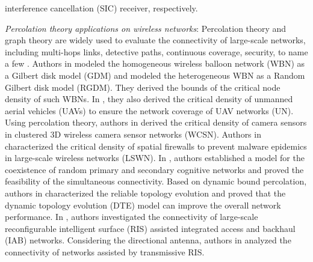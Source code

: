 interference cancellation (SIC) receiver, respectively.

\indent \textit{Percolation theory applications on wireless networks}: Percolation theory and graph theory are widely used to evaluate the connectivity of large-scale networks, including multi-hops links, detective paths, continuous coverage, security, to name a few \cite{haenggi2009stochastic,haenggi2012stochastic,elsawy2023tutorial}. Authors in \cite{anjum2019percolation} modeled the homogeneous wireless balloon network (WBN) as a Gilbert disk model (GDM) and modeled the heterogeneous WBN as a Random Gilbert disk model (RGDM).
They derived the bounds of the critical node density of such WBNs. In \cite{anjum2020coverage}, they also derived the critical density of unmanned aerial vehicles (UAVs) to ensure the network coverage of UAV networks (UN). Using percolation theory, authors in \cite{wang2019cooperative} derived the critical density of camera sensors in clustered 3D wireless camera sensor networks (WCSN). Authors in \cite{zhaikhan2020safeguarding} characterized the critical density of spatial firewalls to prevent malware epidemics in large-scale wireless networks (LSWN). In \cite{yemini2019simultaneous}, authors established a model for the coexistence of random primary and secondary cognitive networks and proved the feasibility of the simultaneous connectivity. Based on dynamic bound percolation, authors in \cite{han2024dynamic} characterized the reliable topology evolution and proved that the dynamic topology evolution (DTE) model can improve the overall network performance.
In \cite{wu2023connectivity}, authors investigated the connectivity of large-scale reconfigurable intelligent surface (RIS) assisted integrated access and backhaul (IAB) networks.
Considering the directional antenna, authors in \cite{zhu2023connectivity} analyzed the connectivity of networks assisted by transmissive RIS.